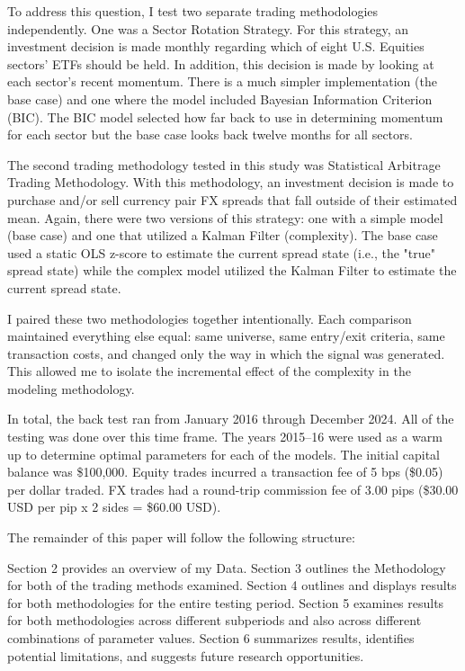 \documentclass[12pt]{article}
\begin{document}
To address this question, I test two separate trading methodologies independently. One was a Sector Rotation Strategy. For this strategy, an investment decision is made monthly regarding which of eight U.S. Equities sectors' ETFs should be held. In addition, this decision is made by looking at each sector's recent momentum. There is a much simpler implementation (the base case) and one where the model included Bayesian Information Criterion (BIC). The BIC model selected how far back to use in determining momentum for each sector but the base case looks back twelve months for all sectors.

The second trading methodology tested in this study was Statistical Arbitrage Trading Methodology. With this methodology, an investment decision is made to purchase and/or sell currency pair FX spreads that fall outside of their estimated mean. Again, there were two versions of this strategy: one with a simple model (base case) and one that utilized a Kalman Filter (complexity). The base case used a static OLS z-score to estimate the current spread state (i.e., the "true" spread state) while the complex model utilized the Kalman Filter to estimate the current spread state.

I paired these two methodologies together intentionally. Each comparison maintained everything else equal: same universe, same entry/exit criteria, same transaction costs, and changed only the way in which the signal was generated. This allowed me to isolate the incremental effect of the complexity in the modeling methodology.

In total, the back test ran from January 2016 through December 2024. All of the testing was done over this time frame. The years 2015--16 were used as a warm up to determine optimal parameters for each of the models. The initial capital balance was \$100,000. Equity trades incurred a transaction fee of 5 bps (\$0.05) per dollar traded. FX trades had a round-trip commission fee of 3.00 pips (\$30.00 USD per pip x 2 sides = \$60.00 USD).

The remainder of this paper will follow the following structure:

Section 2 provides an overview of my Data. Section 3 outlines the Methodology for both of the trading methods examined. Section 4 outlines and displays results for both methodologies for the entire testing period. Section 5 examines results for both methodologies across different subperiods and also across different combinations of parameter values. Section 6 summarizes results, identifies potential limitations, and suggests future research opportunities.
\end{document}
